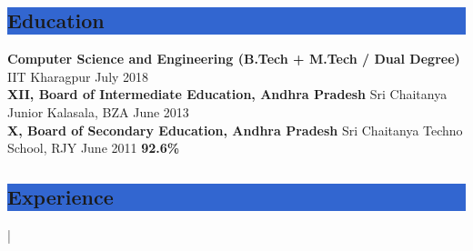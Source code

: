 \documentclass[10pt, letter]{deedy-resume}
\begin{document}
\begin{minipage}{\textwidth} 
\colorbox{highlight}{\parbox{\dimexpr\textwidth-2\fboxsep}{\section{Education}}}
{\bf Computer Science and Engineering (B.Tech + M.Tech / Dual Degree)} \hfill IIT Kharagpur \hspace{90pt} July 2018 \\
{\bf XII, Board of Intermediate Education, Andhra Pradesh}  \hfill Sri Chaitanya Junior Kalasala, BZA \hspace{45pt} June 2013 \hspace{25pt}{\textbf{95.6\scriptsize{\%}}}\\
{\bf X, Board of Secondary Education, Andhra Pradesh}  \hfill Sri Chaitanya Techno School, RJY \hspace{50pt} June 2011 \hspace{24pt} {\textbf{92.6\scriptsize{\%}}}


\colorbox{highlight}{\parbox{\dimexpr\textwidth-2\fboxsep}{\section{Experience}}}


 |
\\
\\


\end{minipage}
\end{document}
